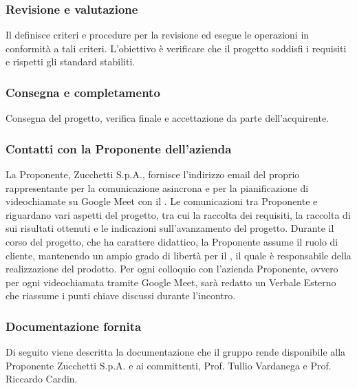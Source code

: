 \subsubsection{Revisione e valutazione}
Il  definisce criteri e procedure per la revisione ed esegue le operazioni in conformità a tali criteri. L'obiettivo è verificare che il progetto soddisfi i requisiti e rispetti gli standard stabiliti.

\subsubsection{Consegna e completamento}
Consegna del progetto, verifica finale e accettazione da parte dell’acquirente.

\subsubsection{Contatti con la Proponente dell’azienda}
La Proponente, Zucchetti S.p.A., fornisce l'indirizzo email del proprio rappresentante per la comunicazione asincrona e per la pianificazione di videochiamate su Google Meet con il . Le comunicazioni tra Proponente e  riguardano vari aspetti del progetto, tra cui la raccolta dei requisiti, la raccolta di  sui risultati ottenuti e le indicazioni sull'avanzamento del progetto. Durante il corso del progetto, che ha carattere didattico, la Proponente assume il ruolo di cliente, mantenendo un ampio grado di libertà per il , il quale è responsabile della realizzazione del prodotto. Per ogni colloquio con l'azienda Proponente, ovvero per ogni videochiamata tramite Google Meet, sarà redatto un Verbale Esterno che riassume i punti chiave discussi durante l'incontro.

\subsubsection{Documentazione fornita}
Di seguito viene descritta la documentazione che il gruppo rende disponibile alla Proponente Zucchetti S.p.A. e ai committenti, Prof. Tullio Vardanega e Prof. Riccardo Cardin.

